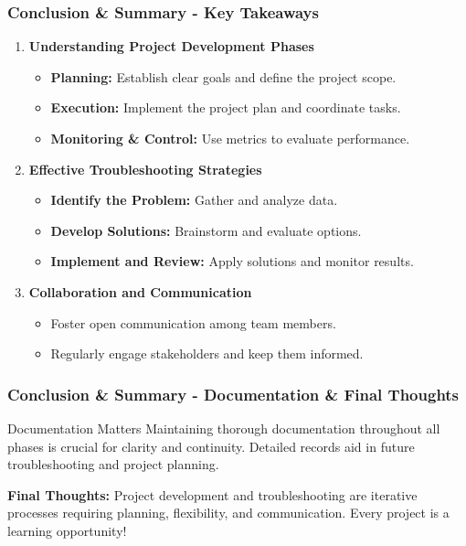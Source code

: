 \documentclass[aspectratio=169]{beamer}
\begin{document}
\begin{frame}[fragile]
    \frametitle{Conclusion \& Summary - Key Takeaways}
    \begin{enumerate}
        \item \textbf{Understanding Project Development Phases}
        \begin{itemize}
            \item \textbf{Planning:} Establish clear goals and define the project scope.
            \item \textbf{Execution:} Implement the project plan and coordinate tasks.
            \item \textbf{Monitoring \& Control:} Use metrics to evaluate performance.
        \end{itemize}
        
        \item \textbf{Effective Troubleshooting Strategies}
        \begin{itemize}
            \item \textbf{Identify the Problem:} Gather and analyze data.
            \item \textbf{Develop Solutions:} Brainstorm and evaluate options.
            \item \textbf{Implement and Review:} Apply solutions and monitor results.
        \end{itemize}
        
        \item \textbf{Collaboration and Communication}
        \begin{itemize}
            \item Foster open communication among team members.
            \item Regularly engage stakeholders and keep them informed.
        \end{itemize}
    \end{enumerate}
\end{frame}

\begin{frame}[fragile]
    \frametitle{Conclusion \& Summary - Documentation \& Final Thoughts}
    \begin{block}{Documentation Matters}
        Maintaining thorough documentation throughout all phases is crucial for clarity and continuity. Detailed records aid in future troubleshooting and project planning.
    \end{block}

    \textbf{Final Thoughts:} Project development and troubleshooting are iterative processes requiring planning, flexibility, and communication. Every project is a learning opportunity!
\end{frame}
\end{document}
